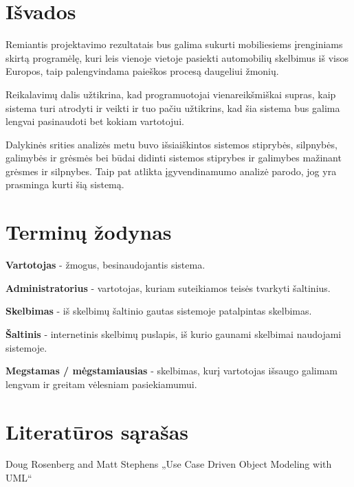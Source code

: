 \documentclass[12pt]{article}
\begin{document}
	\part*{Išvados}	
	Remiantis projektavimo rezultatais bus galima sukurti mobiliesiems įrenginiams skirtą programėlę, kuri leis vienoje vietoje pasiekti automobilių skelbimus iš visos Europos, taip palengvindama paieškos procesą daugeliui žmonių.
	
	Reikalavimų dalis užtikrina, kad programuotojai vienareikšmiškai supras, kaip sistema turi atrodyti ir veikti ir tuo pačiu užtikrins, kad šia sistema bus galima lengvai pasinaudoti bet kokiam vartotojui.
	
	Dalykinės srities analizės metu buvo išsiaiškintos sistemos stiprybės, silpnybės, galimybės ir grėsmės bei būdai didinti sistemos stiprybes ir galimybes mažinant grėsmes ir silpnybes. Taip pat atlikta įgyvendinamumo analizė parodo, jog yra prasminga kurti šią sistemą.
	\pagebreak

	\part*{Terminų žodynas}
	
	\bigskip
	\textbf{Vartotojas} - žmogus, besinaudojantis sistema.
	
	\textbf{Administratorius} - vartotojas, kuriam suteikiamos teisės tvarkyti šaltinius.
	
	\textbf{Skelbimas} - iš skelbimų šaltinio gautas sistemoje patalpintas skelbimas.
	
	\textbf{Šaltinis} - internetinis skelbimų puslapis, iš kurio gaunami skelbimai naudojami sistemoje.
	
	\textbf{Megstamas / mėgstamiausias} - skelbimas, kurį vartotojas išsaugo galimam lengvam ir greitam vėlesniam pasiekiamumui.
	\pagebreak

	\part*{Literatūros sąrašas}
	
	Doug Rosenberg and Matt Stephens „Use Case Driven Object Modeling with UML“
\end{document}
